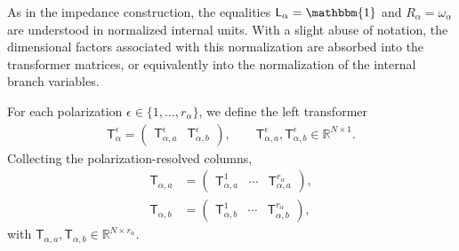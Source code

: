 \documentclass[prx,aps,twocolumn,article]{revtex4-2}
\newcommand{\msf}[1]{\mathsf{#1}}
\newcommand{\msT}{\msf{T}}
\newcommand{\msL}{\msf{L}}
\newcommand{\msId}{\mathbbm{1}}
\begin{document}
As in the impedance construction, the equalities
$\msL_\alpha=\msId$ and $R_\alpha=\omega_\alpha$ are understood in
normalized internal units. With a slight abuse of notation, the
dimensional factors associated with this normalization are absorbed
into the transformer matrices, or equivalently into the normalization
of the internal branch variables.

For each polarization
$\epsilon\in\{1,\ldots,r_\alpha\}$, we define the left transformer
\begin{align}
    \msT_\alpha^\epsilon
    =
    \begin{pmatrix}
        \msT_{\alpha,a}^\epsilon
        &
        \msT_{\alpha,b}^\epsilon
    \end{pmatrix},
    \qquad
    \msT_{\alpha,a}^\epsilon,
    \msT_{\alpha,b}^\epsilon
    \in
    \mathbb{R}^{N\times1}.
    \label{Eq:YDiscreteTransformerDefinition}
\end{align}
Collecting the polarization-resolved columns,
\begin{align}
    \msT_{\alpha,a}
    &=
    \begin{pmatrix}
        \msT_{\alpha,a}^{1}
        &
        \cdots
        &
        \msT_{\alpha,a}^{r_\alpha}
    \end{pmatrix},
    \nonumber\\
    \msT_{\alpha,b}
    &=
    \begin{pmatrix}
        \msT_{\alpha,b}^{1}
        &
        \cdots
        &
        \msT_{\alpha,b}^{r_\alpha}
    \end{pmatrix},
\end{align}
with
$\msT_{\alpha,a},\msT_{\alpha,b}
\in\mathbb{R}^{N\times r_\alpha}$.
\end{document}
